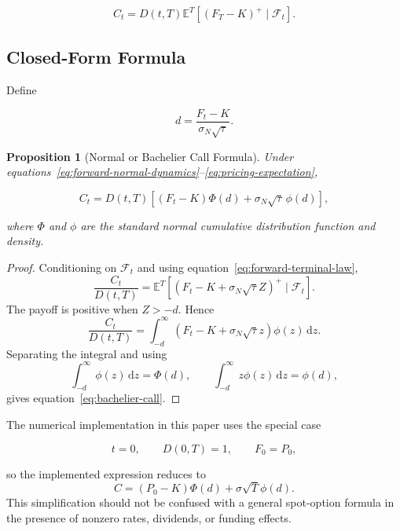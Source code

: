 \documentclass[11pt,a4paper]{article}
\newtheorem{proposition}{Proposition}
\newcommand{\E}{\mathbb{E}}
\newcommand{\dd}{\,\mathrm{d}}
\begin{document}
\begin{equation}
C_t=D(t,T)\E^{T}\!\left[(F_T-K)^+\mid\mathcal{F}_t\right].
\label{eq:pricing-expectation}
\end{equation}

\subsection{Closed-Form Formula}

Define

\begin{equation}
d=\frac{F_t-K}{\sigma_N\sqrt{\tau}}.
\label{eq:bachelier-d}
\end{equation}

\begin{proposition}[Normal or Bachelier Call Formula]
Under equations~\eqref{eq:forward-normal-dynamics}--\eqref{eq:pricing-expectation},

\begin{equation}
C_t=D(t,T)\left[(F_t-K)\Phi(d)+\sigma_N\sqrt{\tau}\,\phi(d)\right],
\label{eq:bachelier-call}
\end{equation}

where \(\Phi\) and \(\phi\) are the standard normal cumulative distribution function and density.
\end{proposition}

\begin{proof}
Conditioning on \(\mathcal{F}_t\) and using equation~\eqref{eq:forward-terminal-law},
\[
\frac{C_t}{D(t,T)}
=\E^T\!\left[(F_t-K+\sigma_N\sqrt{\tau}Z)^+\mid\mathcal{F}_t\right].
\]
The payoff is positive when \(Z>-d\). Hence
\[
\frac{C_t}{D(t,T)}
=\int_{-d}^{\infty}
(F_t-K+\sigma_N\sqrt{\tau}z)\phi(z)\dd z.
\]
Separating the integral and using
\[
\int_{-d}^{\infty}\phi(z)\dd z=\Phi(d),
\qquad
\int_{-d}^{\infty}z\phi(z)\dd z=\phi(d),
\]
gives equation~\eqref{eq:bachelier-call}.
\end{proof}

The numerical implementation in this paper uses the special case

\begin{equation}
t=0,\qquad D(0,T)=1,\qquad F_0=P_0,
\label{eq:numerical-special-case}
\end{equation}

so the implemented expression reduces to
\[
C=(P_0-K)\Phi(d)+\sigma\sqrt{T}\phi(d).
\]
This simplification should not be confused with a general spot-option formula in the presence of nonzero rates, dividends, or funding effects.
\end{document}
